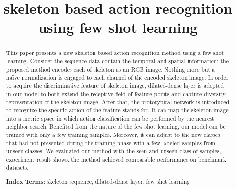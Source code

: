 \documentclass{bmvc2k}
\title{skeleton based action recognition\\ using few shot learning}
\begin{document}
\maketitle

\begin{abstract}
This paper presents a new skeleton-based action recognition method using a few shot learning. Consider the sequence data contain the temporal and spatial information; the proposed method encodes each of skeleton as an RGB image. Nothing more but a naïve normalization is engaged to each channel of the encoded skeleton image. In order to acquire the discriminative feature of skeleton image, dilated-dense layer is adopted in our model to both extend the receptive field of feature points and capture diversity representation of the skeleton image. After that, the prototypical network is introduced to recognize the specific action of the feature stands for. It can map the skeleton image into a metric space in which action classification can be performed by the nearest neighbor search. Benefited from the nature of the few shot learning, our model can be trained with only a few training samples. Moreover, it can adjust to the new classes that had not presented during the training phase with a few labeled samples from unseen classes. We evaluated our method with the seen and unseen class of samples, experiment result shows, the method achieved comparable performance on benchmark datasets.

\textbf{Index Terms:} skeleton sequence, dilated-dense layer, few shot learning
\end{abstract}

\end{document}
